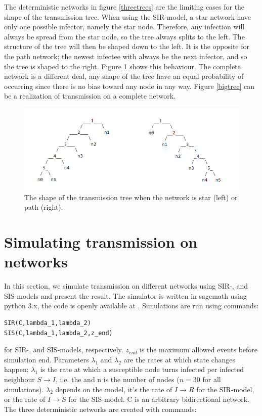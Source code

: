 \documentclass[12pt]{article} %
\numberwithin{equation}{section}
\begin{document}
The deterministic networks in figure \ref{threetrees} are the limiting cases for the shape of the transmission tree. When using the SIR-model, a star network have only one possible infector, namely the star node. Therefore, any infection will always be spread from the star node, so the tree always splits to the left. The structure of the tree will then be shaped down to the left. It is the opposite for the path network; the newest infectee with always be the next infector, and so the tree is shaped to the right. Figure \ref{pathstartree} shows this behaviour. The complete network is a different deal, any shape of the tree have an equal probability of occurring since there is no bias toward any node in any way. Figure \ref{bigtree} can be a realization of transmission on a complete network.
\begin{figure}
    \centering
    \includegraphics[scale=0.7]{starpathtree.png}   
    \caption{The shape of the transmission tree when the network is star (left) or path (right).}
    \label{pathstartree}
\end{figure}
\FloatBarrier


\section{Simulating transmission on networks}\label{simulation-section}
In this section, we simulate transmission on different networks using SIR-, and SIS-models and present the result. The simulator is written in sagemath using python 3.x, the code is openly available at \cite{github}. Simulations are run using commands:
\begin{verbatim}
SIR(C,lambda_1,lambda_2)
SIS(C,lambda_1,lambda_2,z_end)
\end{verbatim}
for SIR-, and SIS-models, respectively. $z_{end}$ is the maximum allowed events before simulation end. Parameters $\lambda_{1}$ and $\lambda_{2}$ are the rates at which state changes happen; $\lambda_1$ is the rate at which a susceptible node turns infected per infected neighbour $S\rightarrow I$, i.e. the and n is the number of nodes ($n=30$ for all simulations). $\lambda_2$ depends on the model, it's the rate of $I\rightarrow R$ for the SIR-model, or the rate of $I\rightarrow S$ for the SIS-model. C is an arbitrary bidirectional network. The three deterministic networks are created with commands:
\end{document}
